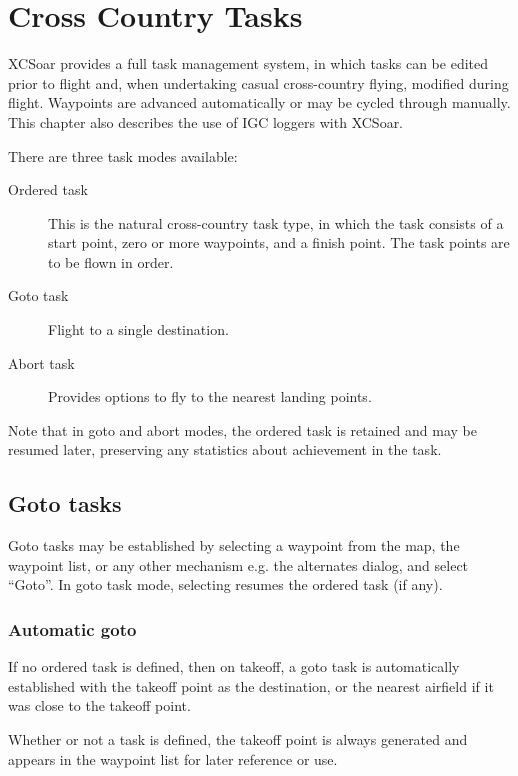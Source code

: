 \chapter{Cross Country Tasks}\label{cha:tasks}

XCSoar provides a full task management system, in which tasks can be
edited prior to flight and, when undertaking casual cross-country
flying, modified during flight.  Waypoints are advanced automatically
or may be cycled through manually.  This chapter also describes the
use of IGC loggers with XCSoar.

There are three task modes available:
\begin{description}
\item[Ordered task] This is the natural cross-country task type,
in which the task consists of a start point, zero or more waypoints,
and a finish point.  The task points are to be flown in order.
\item[Goto task] Flight to a single destination.
\item[Abort task] Provides options to fly to the nearest landing points.
\end{description}

Note that in goto and abort modes, the ordered task is retained and may be resumed
later, preserving any statistics about achievement in the task.

\section{Goto tasks}

Goto tasks may be established by selecting a waypoint from the map,
the waypoint list, or any other mechanism e.g. the alternates dialog,
 and select ``Goto''.  In goto task mode, selecting
\blink{} resumes the ordered task (if
any).

\subsection*{Automatic goto}

If no ordered task is defined, then on takeoff, a goto task is automatically
established with the takeoff point as the destination, or the nearest airfield
if it was close to the takeoff point.

Whether or not a task is defined, the takeoff point is always
generated and appears in the waypoint list for later reference or use.

